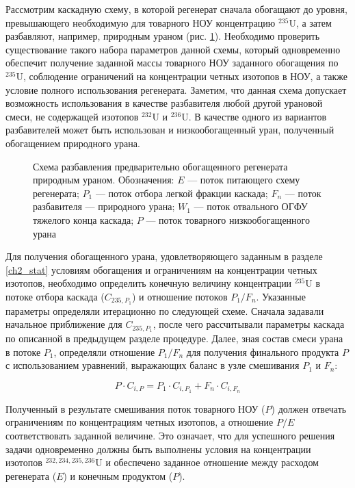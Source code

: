 Рассмотрим каскадную схему, в которой регенерат сначала обогащают до уровня, превышающего необходимую для товарного НОУ концентрацию $^{235}$U, а затем разбавляют, например, природным ураном (рис. \ref{o1}). Необходимо проверить существование такого набора параметров данной схемы, который одновременно обеспечит получение заданной массы товарного НОУ заданного обогащения по $^{235}$U, соблюдение ограничений на концентрации четных изотопов в НОУ, а также условие полного использования регенерата. Заметим, что данная схема допускает возможность использования в качестве разбавителя любой другой урановой смеси, не содержащей изотопов $^{232}$U и $^{236}$U. В качестве одного из вариантов разбавителей может быть использован и низкообогащенный уран, полученный обогащением природного урана.

\begin{figure}[ht]
  \caption{Схема разбавления предварительно обогащенного регенерата природным ураном. Обозначения: $E$ --- поток питающего схему регенерата; $P_1$ --- поток отбора легкой фракции каскада; $F_n$ --- поток разбавителя --- природного урана; $W_1$ --- поток отвального ОГФУ тяжелого конца каскада; $P$ --- поток товарного низкообогащенного урана}\label{o1}
\end{figure}

Для получения обогащенного урана, удовлетворяющего заданным в разделе \ref{ch2_stat} условиям обогащения и ограничениям на концентрации четных изотопов, необходимо определить конечную величину концентрации $^{235}$U в потоке отбора каскада ($C_{235, P_1}$) и отношение потоков ${P_1}{/}{F_n}$. Указанные параметры определяли итерационно по следующей схеме. Сначала задавали начальное приближение для $C_{235, P_1}$, после чего рассчитывали параметры каскада по описанной в предыдущем разделе процедуре. Далее, зная состав смеси урана в потоке $P_1$, определяли отношение ${P_1}{/}{F_n}$ для получения финального продукта $P$ с использованием уравнений, выражающих баланс в узле смешивания $P_1$ и $F_n$:

\begin{equation} \label{mat_balance0} 
  P \cdot C_{i,P} = P_1 \cdot C_{i,P_1} + F_n \cdot C_{i,F_n}
\end{equation} 

Полученный в результате смешивания поток товарного НОУ ($P$) должен отвечать ограничениям по концентрациям четных изотопов, а отношение $P/E$ соответствовать заданной величине. Это означает, что для успешного решения задачи одновременно должны быть выполнены условия на концентрации изотопов $^{232,234,235,236}$U и обеспечено заданное отношение между расходом регенерата ($E$) и конечным продуктом ($P$). 

